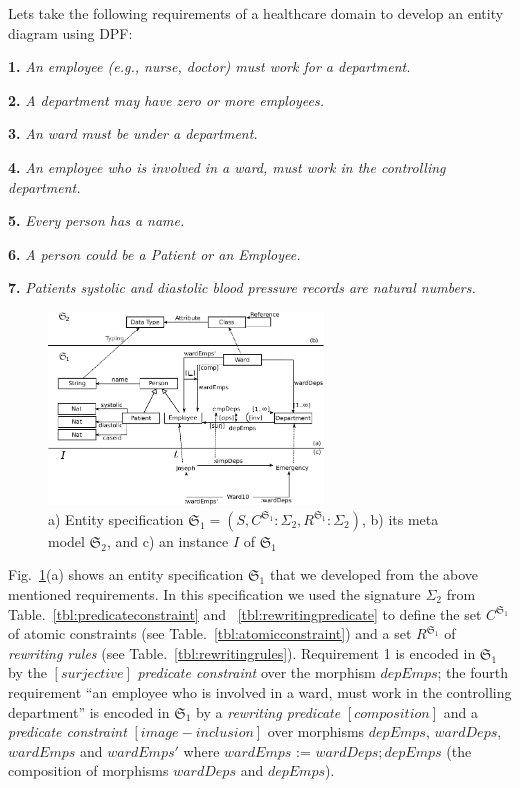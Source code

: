 \documentclass{eceasst}
\begin{document}
Lets take the following requirements of a healthcare domain to develop an entity diagram using DPF:


\textbf{1.} \textit{An employee (e.g., nurse, doctor) must work for a department. }

\textbf{2.} \textit{A department may have zero or more employees. }

\textbf{3.} \textit{An ward must be under a department. }

\textbf{4.} \textit{An employee who is involved in a ward, must work in the controlling department. }

\textbf{5.} \textit{Every person has a name. }

\textbf{6.} \textit{A person could be a Patient or an Employee. }

\textbf{7.} \textit{Patients systolic and diastolic blood pressure records are natural numbers. }






\begin{figure}[h]
\centering
 \includegraphics[width=0.65\textwidth]{entity-1.pdf}
 \caption{ a) Entity specification $\mathfrak{S}_1 = (S, C^{\mathfrak{S}_1} : \Sigma_2 , R^{\mathfrak{S}_1} : \Sigma_2)$, b) its meta model $\mathfrak{S}_2$, and c) an instance $I$ of $\mathfrak{S}_1$}
 \label{fig:entity-diagram}
 \end{figure}

Fig.~\ref{fig:entity-diagram}(a) shows an entity specification $\mathfrak{S}_1$ that we developed from the above mentioned requirements. 
In this specification we used the signature $\Sigma_2$ from Table.~\ref{tbl:predicateconstraint} and ~\ref{tbl:rewritingpredicate} to define the set $C^{\mathfrak{S}_1}$ of atomic constraints 
(see Table.~\ref{tbl:atomicconstraint}) and a set $R^{\mathfrak{S}_1}$ of \textit{rewriting rules} (see Table.~\ref{tbl:rewritingrules}). 
Requirement 1 is encoded in $\mathfrak{S}_1$ by the $[surjective]$ \textit{predicate constraint} over the morphism $depEmps$; 
the fourth requirement ``an employee who is involved in a ward, must work in the controlling department'' is encoded in $\mathfrak{S}_1$ by a \textit{rewriting predicate} $[composition]$ 
and a \textit{predicate constraint} $[image-inclusion]$ over morphisms $depEmps$, $wardDeps$, $wardEmps$ and $wardEmps'$ where $wardEmps$ := $wardDeps; depEmps$ 
(the composition of morphisms $wardDeps$ and $depEmps$).
\end{document}
